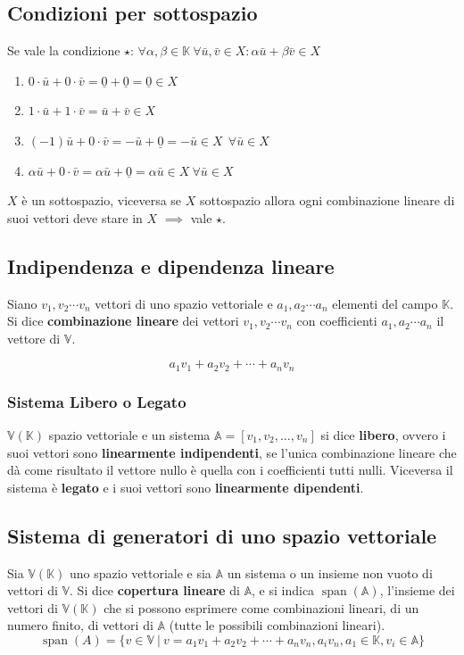 \documentclass{article}
\DeclareMathOperator{\Span}{span}
\begin{document}
\subsection{Condizioni per sottospazio}

Se vale la condizione $\star$: $\forall\alpha,\beta\in\mathbb K \
    \forall\bar{u},\bar v\in X:\alpha\bar u+\beta\bar v\in X$
\begin{enumerate}
    \item $0\cdot\bar u + 0\cdot\bar v = \underline 0 + \underline 0 = \underline 0\in X$
    \item $1\cdot\bar u+1\cdot\bar v = \bar u+\bar v \in X$
    \item $(-1)\bar u + 0 \cdot\bar v = -\bar u +\underline 0 = -\bar u \in X \ \ \forall\bar u\in X$
    \item $\alpha\bar u+0\cdot\bar v=\alpha\bar u+\underline 0 = \alpha\bar u\in X \ \forall\bar u \in X$
\end{enumerate}
$X$ è un sottospazio, viceversa se $X$ sottospazio allora ogni combinazione lineare di suoi vettori deve stare in $X$ $\implies$ vale $\star$.

\subsection{Indipendenza e dipendenza lineare}
Siano $v_1, v_2\cdots v_n$ vettori di uno spazio vettoriale e $a_1, a_2\cdots
    a_n$ elementi del campo $\mathbb{K}$. Si dice \textbf{combinazione lineare} dei
vettori $v_1, v_2 \cdots v_n$ con coefficienti $a_1, a_2\cdots a_n$ il vettore
di $\mathbb V$.

\[a_1v_1+a_2v_2+\cdots+a_n v_n\]

\subsubsection{Sistema Libero o Legato}
$\mathbb V(\mathbb K)$ spazio vettoriale e un sistema $\mathbb A=[v_1, v_2,\ldots,v_n]$ si dice \textbf{libero}, ovvero i suoi vettori sono \textbf{linearmente indipendenti}, se l'unica combinazione lineare che dà come risultato il vettore nullo è quella con i coefficienti tutti nulli. Viceversa il sistema è \textbf{legato} e i suoi vettori sono \textbf{linearmente dipendenti}.

\subsection{Sistema di generatori di uno spazio vettoriale}
Sia $\mathbb V(\mathbb K)$ uno spazio vettoriale e sia $\mathbb A$ un sistema o
un insieme non vuoto di vettori di $\mathbb V$. Si dice \textbf{copertura
    lineare} di $\mathbb A$, e si indica $\Span(\mathbb A)$, l'insieme dei vettori
di $\mathbb V(\mathbb K)$ che si possono esprimere come combinazioni lineari,
di un numero finito, di vettori di $\mathbb A$ (tutte le possibili combinazioni
lineari).
\[
    \Span(A) = \{v\in\mathbb V \ | \ v = a_1v_1+a_2v_2+\cdots+a_n v_n,a_i v_n,a_1\in\mathbb K,v_i\in\mathbb A\}
\]
\end{document}
